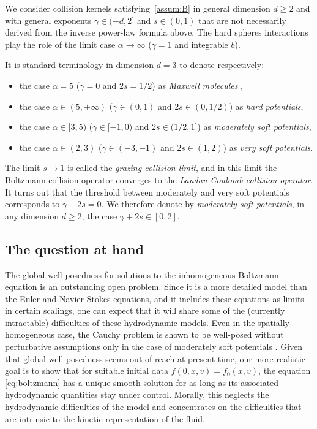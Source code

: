 We consider collision kernels satisfying~\eqref{assum:B} in general
dimension $d \ge 2$ and with general exponents $\gamma \in (-d,2]$ and
$s \in (0,1)$ that are not necessarily derived from the inverse
power-law formula above. The hard spheres interactions play the role
of the limit case $\alpha \to \infty$ ($\gamma=1$ and integrable $b$).

It is standard terminology in dimension $d=3$ to denote respectively:
\begin{itemize}
\item
the case $\alpha=5$ ($\gamma=0$ and $2s=1/2$) as \emph{Maxwell
molecules} \cite{Maxwell1867},
\item
the case $\alpha \in (5,+\infty)$ ($\gamma \in (0,1)$ and
$2s \in (0,1/2)$) as \emph{hard potentials},
\item
the case $\alpha \in [3,5)$ ($\gamma \in [-1,0)$ and
$2s \in (1/2,1]$) as \emph{moderately soft potentials},
\item
the case $\alpha \in (2,3)$ ($\gamma \in (-3,-1)$ and
$2s \in (1,2)$) as \emph{very soft potentials}.
\end{itemize}

The limit $s \to 1$ is called the \emph{grazing collision limit}, and
in this limit the Boltzmann collision operator converges to
the \emph{Landau-Coulomb collision operator}. It turns out that the
threshold between moderately and very soft potentials corresponds to
\hbox{$\gamma + 2s =0$}. We therefore denote by \emph{moderately soft
potentials}, in any dimension $d \ge 2$, the case
$\gamma + 2s \in [0,2]$.

\subsection{The question at hand}

The global well-posedness for solutions to the inhomogeneous Boltzmann
equation is an outstanding open problem. Since it is a more detailed
model than the Euler and Navier-Stokes equations, and it includes
these equations as limits in certain scalings, one can expect that it
will share some of the (currently intractable) difficulties of these
hydrodynamic models. Even in the spatially homogeneous case, the
Cauchy problem is shown to be well-posed without perturbative
assumptions only in the case of moderately soft potentials
\cite{MR2525118}. Given that global well-posedness seems out of reach
at present time, our more realistic goal is to show that for suitable
initial data $f(0,x,v) = f_0(x,v)$, the equation \eqref{eq:boltzmann}
has a unique smooth solution for as long as its associated
hydrodynamic quantities stay under control. Morally, this neglects the
hydrodynamic difficulties of the model and concentrates on the
difficulties that are intrinsic to the kinetic representation of the
fluid.

